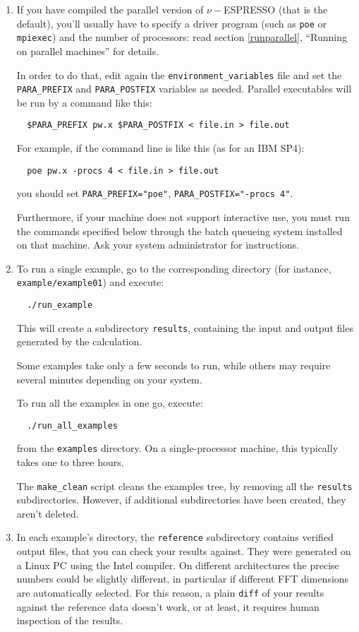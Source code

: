 \documentclass[12pt,a4paper]{article}
\begin{document}
\begin{enumerate}
  \item
If you have compiled the parallel version of $\nu-$ESPRESSO (that is the
default), you'll usually have to specify a driver program (such as
\texttt{poe} or \texttt{mpiexec}) and the number of processors: read
section \ref{runparallel}, ``Running on parallel machines'' for
details.

In order to do that, edit again the \texttt{environment\_variables}
file and set the \texttt{PARA\_PREFIX} and \texttt{PARA\_POSTFIX}
variables as needed.
Parallel executables will be run by a command like this:
\begin{verbatim}
  $PARA_PREFIX pw.x $PARA_POSTFIX < file.in > file.out
\end{verbatim}

For example, if the command line is like this (as for an IBM SP4):
\begin{verbatim}
  poe pw.x -procs 4 < file.in > file.out
\end{verbatim}
you should set \texttt{PARA\_PREFIX="poe"},
\texttt{PARA\_POSTFIX="-procs 4"}.

Furthermore, if your machine does not support interactive use, you
must run the commands specified below through the batch queueing
system installed on that machine.
Ask your system administrator for instructions.

  \item
To run a single example, go to the corresponding directory (for
instance, \texttt{example/example01}) and execute:
\begin{verbatim}
  ./run_example
\end{verbatim}
This will create a subdirectory \texttt{results}, containing the input
and output files generated by the calculation.

Some examples take only a few seconds to run, while others may require
several minutes depending on your system.

To run all the examples in one go, execute:
\begin{verbatim}
  ./run_all_examples
\end{verbatim}
from the \texttt{examples} directory.
On a single-processor machine, this typically takes one to three
hours.

The \texttt{make\_clean} script cleans the examples tree, by removing
all the \texttt{results} subdirectories.  However, if additional
subdirectories have been created, they aren't deleted.

  \item
In each example's directory, the \texttt{reference} subdirectory
contains verified output files, that you can check your results
against.
They were generated on a Linux PC using the Intel compiler.
On different architectures the precise numbers could be slightly
different, in particular if different FFT dimensions are automatically
selected.  For this reason, a plain \texttt{diff} of your results
against the reference data doesn't work, or at least, it requires
human inspection of the results.


\end{enumerate}
\end{document}
